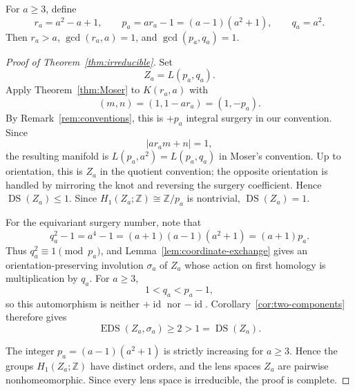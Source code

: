 \documentclass[11pt]{amsart}
\newcommand{\DS}{\operatorname{DS}}
\newcommand{\EDS}{\operatorname{EDS}}
\newcommand{\id}{\operatorname{id}}
\newcommand{\Z}{\mathbb{Z}}
\theoremstyle{definition}
\theoremstyle{remark}
\begin{document}
For $a\geq3$, define
\[
   r_a=a^2-a+1,
   \qquad
   p_a=ar_a-1=(a-1)(a^2+1),
   \qquad
   q_a=a^2.
\]
Then $r_a>a$, $\gcd(r_a,a)=1$, and $\gcd(p_a,q_a)=1$.

\begin{proof}[Proof of Theorem~\ref{thm:irreducible}]
Set
\[
   Z_a=L(p_a,q_a).
\]
Apply Theorem~\ref{thm:Moser} to $K(r_a,a)$ with
\[
   (m,n)=(1,1-ar_a)=(1,-p_a).
\]
By Remark~\ref{rem:conventions}, this is $+p_a$ integral surgery in our convention. Since
\[
   |ar_am+n|=1,
\]
the resulting manifold is $L(p_a,a^2)=L(p_a,q_a)$ in Moser's convention. Up to orientation, this is $Z_a$ in the quotient convention; the opposite orientation is handled by mirroring the knot and reversing the surgery coefficient. Hence $\DS(Z_a)\leq1$. Since $H_1(Z_a;\Z)\cong\Z/p_a$ is nontrivial, $\DS(Z_a)=1$.

For the equivariant surgery number, note that
\[
   q_a^2-1=a^4-1=(a+1)(a-1)(a^2+1)=(a+1)p_a.
\]
Thus $q_a^2\equiv1\pmod{p_a}$, and Lemma~\ref{lem:coordinate-exchange} gives an orientation-preserving involution $\sigma_a$ of $Z_a$ whose action on first homology is multiplication by $q_a$. For $a\geq3$,
\[
   1<q_a<p_a-1,
\]
so this automorphism is neither $+\id$ nor $-\id$. Corollary~\ref{cor:two-components} therefore gives
\[
   \EDS(Z_a,\sigma_a)\geq2>1=\DS(Z_a).
\]

The integer $p_a=(a-1)(a^2+1)$ is strictly increasing for $a\geq3$. Hence the groups $H_1(Z_a;\Z)$ have distinct orders, and the lens spaces $Z_a$ are pairwise nonhomeomorphic. Since every lens space is irreducible, the proof is complete.
\end{proof}
\end{document}
